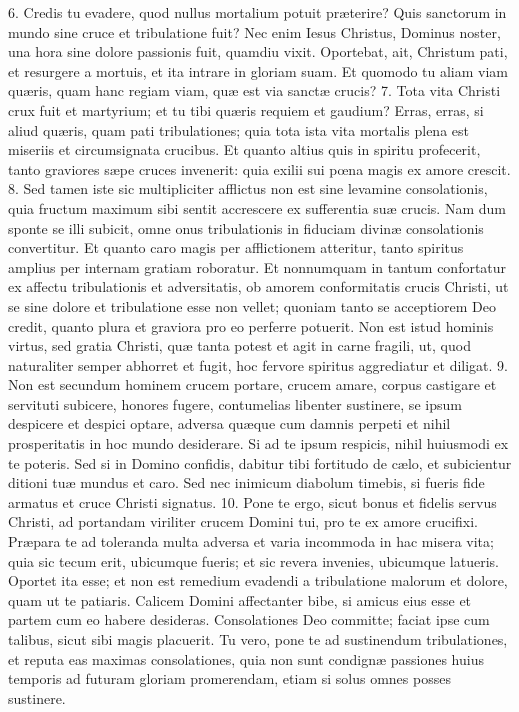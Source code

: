 6. Credis tu evadere, quod nullus mortalium potuit præterire? Quis sanctorum in mundo sine cruce et tribulatione fuit? Nec enim Iesus Christus, Dominus noster, una hora sine dolore passionis fuit, quamdiu vixit. Oportebat, ait, Christum pati, et resurgere a mortuis, et ita intrare in gloriam suam. Et quomodo tu aliam viam quæris, quam hanc regiam viam, quæ est via sanctæ crucis?
7. Tota vita Christi crux fuit et martyrium; et tu tibi quæris requiem et gaudium? Erras, erras, si aliud quæris, quam pati tribulationes; quia tota ista vita mortalis plena est miseriis et circumsignata crucibus. Et quanto altius quis in spiritu profecerit, tanto graviores sæpe cruces invenerit: quia exilii sui pœna magis ex amore crescit.
8. Sed tamen iste sic multipliciter afflictus non est sine levamine consolationis, quia fructum maximum sibi sentit accrescere ex sufferentia suæ crucis. Nam dum sponte se illi subicit, omne onus tribulationis in fiduciam divinæ consolationis convertitur. Et quanto caro magis per afflictionem atteritur, tanto spiritus amplius per internam gratiam roboratur. Et nonnumquam in tantum confortatur ex affectu tribulationis et adversitatis, ob amorem conformitatis crucis Christi, ut se sine dolore et tribulatione esse non vellet; quoniam tanto se acceptiorem Deo credit, quanto plura et graviora pro eo perferre potuerit. Non est istud hominis virtus, sed gratia Christi, quæ tanta potest et agit in carne fragili, ut, quod naturaliter semper abhorret et fugit, hoc fervore spiritus aggrediatur et diligat.
9. Non est secundum hominem crucem portare, crucem amare, corpus castigare et servituti subicere, honores fugere, contumelias libenter sustinere, se ipsum despicere et despici optare, adversa quæque cum damnis perpeti et nihil prosperitatis in hoc mundo desiderare. Si ad te ipsum respicis, nihil huiusmodi ex te poteris. Sed si in Domino confidis, dabitur tibi fortitudo de cælo, et subicientur ditioni tuæ mundus et caro. Sed nec inimicum diabolum timebis, si fueris fide armatus et cruce Christi signatus.
10. Pone te ergo, sicut bonus et fidelis servus Christi, ad portandam viriliter crucem Domini tui, pro te ex amore crucifixi. Præpara te ad toleranda multa adversa et varia incommoda in hac misera vita; quia sic tecum erit, ubicumque fueris; et sic revera invenies, ubicumque latueris. Oportet ita esse; et non est remedium evadendi a tribulatione malorum et dolore, quam ut te patiaris. Calicem Domini affectanter bibe, si amicus eius esse et partem cum eo habere desideras. Consolationes Deo committe; faciat ipse cum talibus, sicut sibi magis placuerit. Tu vero, pone te ad sustinendum tribulationes, et reputa eas maximas consolationes, quia non sunt condignæ passiones huius temporis ad futuram gloriam promerendam, etiam si solus omnes posses sustinere.
